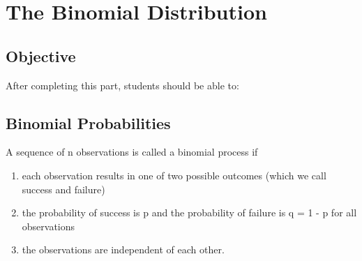 \documentclass[11pt, chapterprefix=true]{scrbook}\usepackage[]{graphicx}\usepackage[]{color}
\begin{document}

\chapter{The Binomial Distribution}
\label{chap:ch7}

\section{Objective}

After completing this part, students should be able to:


\section{Binomial Probabilities}

A sequence of n observations is called a binomial process if

\begin{enumerate}
\item each observation results in one of two possible outcomes (which we call    success and failure)
\item the probability of success is p and the probability of failure is q = 1 - p for all observations
\item the observations are independent of each other.
\end{enumerate}
\end{document}
